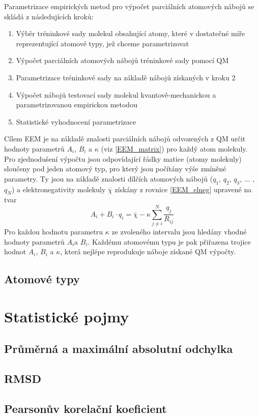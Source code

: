 Parametrizace empirických metod pro výpočet parciálních atomových nábojů se skládá z následujících kroků:

\begin{enumerate}
\itemsep0em
    \item Výběr tréninkové sady molekul obsahující atomy, které v dostatečné míře reprezentující atomové typy, jež chceme parametrizovat
    \item Výpočet parciálních atomových nábojů tréninkové sady pomocí QM
    \item Parametrizace tréninkové sady na základě nábojů získaných v kroku 2
    \item Výpočet nábojů testovací sady molekul kvantově-mechanickou a parametrizovanou empirickou metodou
    \item Statistické vyhodnocení parametrizace
\end{enumerate}

Cílem EEM je na základě znalosti parciálních nábojů odvozených z QM určit hodnoty parametrů $A_i$, $B_i$ a $\kappa$ (viz \ref{EEM_matrix}) pro každý atom molekuly. Pro zjednodušení výpočtu jsou odpovídající řádky matice (atomy molekuly) sloučeny pod jeden atomový typ, pro který jsou počítány výše zmíněné parametry. Ty jsou na základě znalosti dílčích atomových nábojů ($q_1$, $q_2$, $q_3$, ... , $q_N$) a elektronegativity molekuly $\overline{\chi}$ získány z rovnice \ref{EEM_elneg} upravené na tvar 
\begin{equation}
   A_i + B_i\cdot q_i = \overline{\chi} - \kappa \sum_{j \neq i}^{N} \frac{q_j}{R_{ij}}
\end{equation}
Pro každou hodnotu parametru $\kappa$ ze zvoleného intervalu jsou hledány vhodné hodnoty parametrů $A_i$a $B_i$. Každému atomovému typu je pak přiřazena trojice hodnot $A_i$, $B_i$ a $\kappa$, která nejlépe reprodukuje náboje získané QM výpočty.



\subsection{Atomové typy}
\section{Statistické pojmy}
\subsection{Průměrná a maximální absolutní odchylka}
\subsection{RMSD}
\subsection{Pearsonův korelační koeficient}



